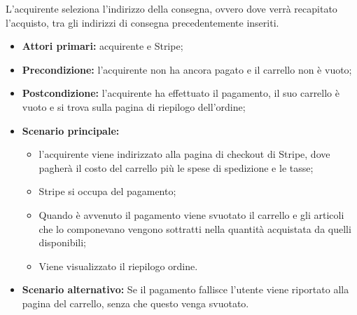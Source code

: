 \resetSubUC

L'acquirente seleziona l'indirizzo della consegna, ovvero dove verrà recapitato l'acquisto, tra gli indirizzi di consegna precedentemente inseriti.
\begin{itemize}
    \item \textbf{Attori primari:} acquirente e Stripe;
    \item \textbf{Precondizione:} l'acquirente non ha ancora pagato e il carrello non è vuoto;
    \item \textbf{Postcondizione:} l'acquirente ha effettuato il pagamento, il suo carrello è vuoto e si trova sulla pagina di riepilogo dell'ordine;
    \item \textbf{Scenario principale:}
        \begin{itemize}
            \item l'acquirente viene indirizzato alla pagina di checkout di Stripe, dove pagherà il costo del carrello più le spese di spedizione e le tasse;
            \item Stripe si occupa del pagamento;
            \item Quando è avvenuto il pagamento viene svuotato il carrello e gli articoli che lo componevano vengono sottratti nella quantità acquistata da quelli disponibili;
            \item Viene visualizzato il riepilogo ordine.
        \end{itemize}
    \item \textbf{Scenario alternativo:} Se il pagamento fallisce l'utente viene riportato alla pagina del carrello, senza che questo venga svuotato.
\end{itemize}

